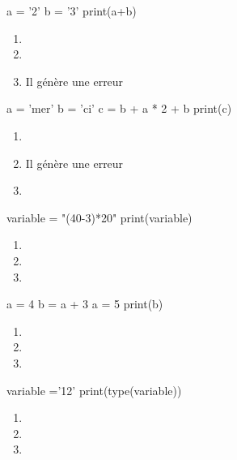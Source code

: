 \documentclass[a4paper,10pt]{article}
\begin{document}
\begin{multicols}{2}
\begin{pythoncode}
a = '2'
b = '3'
print(a+b)
\end{pythoncode}
\begin{enumerate}[\case\ \ a.]
\item 	{}
\item 	{}
\item 	Il génère une erreur
\end{enumerate}
\newpage
\begin{pythoncode}
a = 'mer'
b = 'ci'
c = b + a * 2 + b
print(c)
\end{pythoncode}
\begin{enumerate}[\case\ \ a.]
\item 	{}
\item 	Il génère une erreur
\item 	{}
\end{enumerate}


\begin{pythoncode}
variable = "(40-3)*20"
print(variable)
\end{pythoncode}
\begin{enumerate}[\case\ \ a.]
\item 	{}
\item 	{}
\item 	{}
\end{enumerate}


\begin{pythoncode}
a = 4
b = a + 3
a = 5
print(b)
\end{pythoncode}
\begin{enumerate}[\case\ \ a.]
\item {}
\item 	{}
\item {}
\end{enumerate}


\begin{pythoncode}
variable ='12'
print(type(variable))
\end{pythoncode}
\begin{enumerate}[\case\ \ a.]
\item 	{}
\item 	{}
\item 	{}
\end{enumerate}

\end{multicols}
\end{document}
